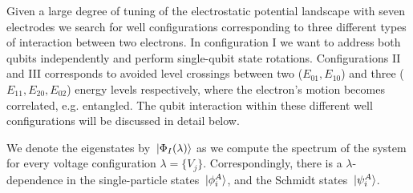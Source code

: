 \documentclass[twocolumn,superscriptaddress,unsortedaddress,
 amsmath,amssymb,
 aps,
]{revtex4-2}
\begin{document}
    Given a large degree of tuning of the electrostatic potential landscape with seven electrodes we search for well configurations corresponding to three different types of interaction between two electrons. In configuration I we want to address both qubits independently and perform single-qubit state rotations. Configurations II and III corresponds to avoided level crossings between two ($E_{01}, E_{10}$) and three ($E_{11}, E_{20}, E_{02}$) energy levels respectively, where the electron's motion becomes correlated, e.g. entangled. The qubit interaction within these different well configurations will be discussed in detail below. 
    

    We denote the eigenstates by $\ket*{\Phi_I(\lambda)}$ as we compute the spectrum of the system for every voltage configuration $\lambda = \{V_j\}$.
    Correspondingly, there is a $\lambda$-dependence in the single-particle states
    $\ket*{\phi^{A}_i}$, and the Schmidt states $\ket*{\psi^{A}_i}$.
\end{document}
